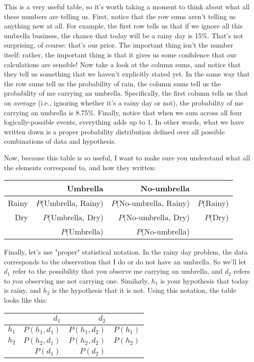 This is a very useful table, so it's worth taking a moment to think about what all these numbers are telling us. First, notice that the row sums aren't telling us anything new at all. For example, the first row tells us that if we ignore all this umbrella business, the chance that today will be a rainy day is 15\%. That's not surprising, of course: that's our prior. The important thing isn't the number itself: rather, the important thing is that it gives us some confidence that our calculations are sensible! Now take a look at the column sums, and notice that they tell us something that we haven't explicitly stated yet. In the same way that the row sums tell us the probability of rain, the column sums tell us the probability of me carrying an umbrella. Specifically, the first column tells us that on average (i.e., ignoring whether it's a rainy day or not), the probability of me carrying an umbrella is 8.75\%. Finally, notice that when we sum across all four logically-possible events, everything adds up to 1. In other words, what we have written down is a proper probability distribution defined over all possible combinations of data and hypothesis.


Now, because this table is so useful, I want to make sure you understand what all the elements correspond to, and how they written:

\begin{center}
\begin{tabular}{r|rr|r}
& Umbrella & No-umbrella &  \\[6pt] \hline
Rainy & $P$(Umbrella, Rainy) & $P$(No-umbrella, Rainy) & $P$(Rainy) \\[6pt]
Dry & $P$(Umbrella, Dry) & $P$(No-umbrella, Dry)  & $P$(Dry) \\[6pt] \hline
 & $P$(Umbrella) & $P$(No-umbrella) & 
\end{tabular}
\end{center}


Finally, let's use "proper" statistical notation. In the rainy day problem, the data corresponds to the observation that I do or do not have an umbrella. So we'll let $d_1$ refer to the possibility that you observe me carrying an umbrella, and $d_2$ refers to you observing me not carrying one. Similarly, $h_1$ is your hypothesis that today is rainy, and $h_2$ is the hypothesis that it is not. Using this notation, the table looks like this:

 \begin{center}
\begin{tabular}{r|rr|r}
& $d_1$ & $d_2$ &  \\[6pt] \hline
$h_1$ & $P(h_1, d_1)$ & $P(h_1, d_2)$ & $P(h_1)$ \\[6pt]
$h_2$ & $P(h_2, d_1)$ & $P(h_2, d_2)$ & $P(h_2)$ \\[6pt] \hline
 & $P(d_1)$ & $P(d_2)$ & 
\end{tabular}
\end{center}



